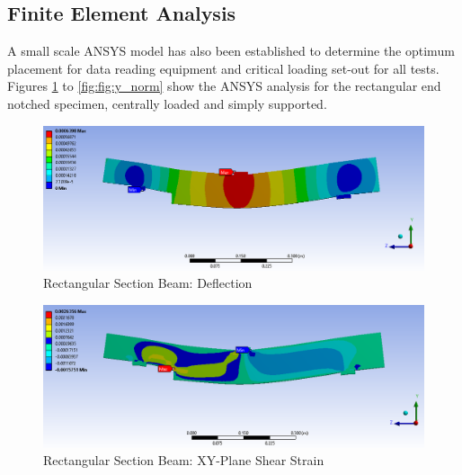 \documentclass[11pt,a4paper]{article}
\numberwithin{equation}{subsection}
\begin{document}
\pagebreak	

\subsection{Finite Element Analysis}
\noindent
A small scale ANSYS model has also been established to determine the optimum placement for data reading equipment and critical loading set-out for all tests. Figures \ref{fig:Def} to \ref{fig:fig:y_norm} show the ANSYS analysis for the rectangular end notched specimen, centrally loaded and simply supported.

\vspace*{\baselineskip}

\begin{figure}[h]
	\begin{center}
		\includegraphics[scale=0.45]{Ansys_Deflection}
	\end{center}
	
	\caption{Rectangular Section Beam: Deflection}
	\label{fig:Def}
\end{figure}
\pagebreak

\begin{figure}[h]
	\begin{center}
		\includegraphics[scale=0.45]{YZ_shear_strain}
	\end{center}
	\caption{Rectangular Section Beam: XY-Plane Shear Strain}
	\label{fig:yz_shear}
\end{figure}
\end{document}
